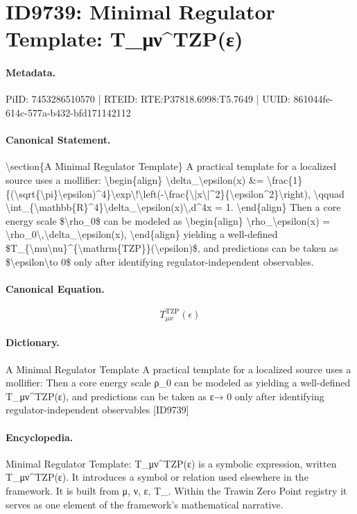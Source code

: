 \section*{ID9739: Minimal Regulator Template: T\_μν\textasciicircum{}TZP(ε)}
\paragraph{Metadata.}
PiID: 7453286510570 | RTEID: RTE:P37818.6998:T5.7649 | UUID: 861044fe-614c-577a-b432-bfd171142112

\paragraph{Canonical Statement.}
\textbackslash{}section\{A Minimal Regulator Template\} A practical template for a localized source uses a mollifier: \textbackslash{}begin\{align\} \textbackslash{}delta\_\textbackslash{}epsilon(x) \&= \textbackslash{}frac\{1\}\{(\textbackslash{}sqrt\{\textbackslash{}pi\}\textbackslash{}epsilon)\textasciicircum{}4\}\textbackslash{}exp\textbackslash{}!\textbackslash{}left(-\textbackslash{}frac\{\textbackslash{}|x\textbackslash{}|\textasciicircum{}2\}\{\textbackslash{}epsilon\textasciicircum{}2\}\textbackslash{}right), \textbackslash{}qquad \textbackslash{}int\_\{\textbackslash{}mathbb\{R\}\textasciicircum{}4\}\textbackslash{}delta\_\textbackslash{}epsilon(x)\textbackslash{},d\textasciicircum{}4x = 1. \textbackslash{}end\{align\} Then a core energy scale \$\textbackslash{}rho\_0\$ can be modeled as \textbackslash{}begin\{align\} \textbackslash{}rho\_\textbackslash{}epsilon(x) = \textbackslash{}rho\_0\textbackslash{},\textbackslash{}delta\_\textbackslash{}epsilon(x), \textbackslash{}end\{align\} yielding a well-defined \$T\_\{\textbackslash{}mu\textbackslash{}nu\}\textasciicircum{}\{\textbackslash{}mathrm\{TZP\}\}(\textbackslash{}epsilon)\$, and predictions can be taken as \$\textbackslash{}epsilon\textbackslash{}to 0\$ only after identifying regulator-independent observables.

\paragraph{Canonical Equation.}
\[
T_{\mu\nu}^{\mathrm{TZP}}(\epsilon)
\]

\paragraph{Dictionary.}
A Minimal Regulator Template A practical template for a localized source uses a mollifier: Then a core energy scale ρ\_0 can be modeled as yielding a well-defined T\_μν\textasciicircum{}TZP(ε), and predictions can be taken as ε→ 0 only after identifying regulator-independent observables [ID9739]

\paragraph{Encyclopedia.}
Minimal Regulator Template: T\_μν\textasciicircum{}TZP(ε) is a symbolic expression, written T\_μν\textasciicircum{}TZP(ε). It introduces a symbol or relation used elsewhere in the framework. It is built from μ, ν, ε, T\_. Within the Trawin Zero Point registry it serves as one element of the framework's mathematical narrative.
